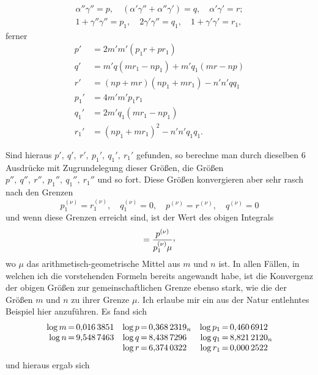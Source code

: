 \[
\begin{gathered}
\alpha''\gamma''=p,\quad(\alpha'\gamma''+\alpha''\gamma')=q,\quad\alpha'\gamma'=r;\\
1+\gamma''\gamma''=p_1,\quad2\gamma'\gamma''=q_1,\quad1+\gamma'\gamma'=r_1,
\end{gathered}
\]
ferner
\[
\begin{aligned}
p'&=2m'm'(p_1r+pr_1)\\
q'&=m'q(mr_1-np_1)+m'q_1(mr-np)\\
r'&=(np+mr)(np_1+mr_1)-n'n'qq_1\\
p_1'&=4m'm'p_1r_1\\
q_1'&=2m'q_1(mr_1-np_1)\\
r_1'&=(np_1+mr_1)^2-n'n'q_1q_1.
\end{aligned}
\]
\par Sind hieraus \(p',\ q',\ r',\ p_1',\ q_1',\ r_1'\) gefunden, so berechne man durch dieselben 6 Ausdrücke mit Zugrundelegung dieser Größen, die Größen \(p'',\ q'',\ r'',\ p_1'',\ q_1'',\ r_1''\) und so fort. Diese Größen konvergieren aber sehr rasch nach den Grenzen
\[
p_1^{(\nu)}=r_1^{(\nu)},\quad q_1^{(\nu)}=0,\quad p^{(\nu)}=r^{(\nu)},\quad q^{(\nu)}=0
\]
und wenn diese Grenzen erreicht sind, ist der Wert des obigen Integrals
\[
=\frac{p^{(\nu)}}{p_1^{(\nu)}\mu}\mathpunct{\raisebox{.45ex}{,}}
\]
wo \(\mu\) das arithmetisch-geometrische Mittel aus \(m\) und \(n\) ist. In allen Fällen, in welchen ich die vorstehenden Formeln bereits angewandt habe, ist die Konvergenz der obigen Größen zur gemeinschaftlichen Grenze ebenso stark, wie die der Größen \(m\) und \(n\) zu ihrer Grenze \(\mu\). Ich erlaube mir ein aus der Natur entlehntes Beispiel hier anzuführen. Es fand sich
\[
\begin{array}{r@{\,}c@{\,}l@{\quad}r@{\,}c@{\,}l@{\quad}r@{\,}c@{\,}l}
\log m&=&0{,}016\,3851&\log p&=&0{,}368\,2319_n&\log p_1&=&0{,}460\,6912\\
\log n&=&9{,}548\,7463&\log q&=&8{,}438\,7296&\log q_1&=&8{,}821\,2120_n\\
&&&\log r&=&6{,}374\,0322&\log r_1&=&0{,}000\,2522
\end{array}
\]
und hieraus ergab sich

